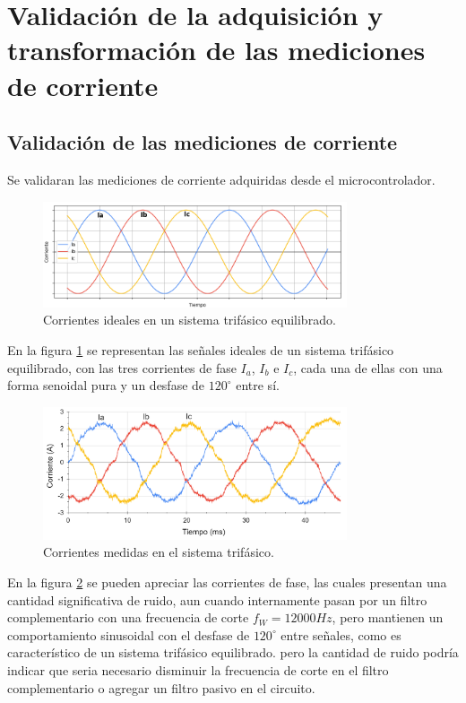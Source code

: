 \documentclass[11pt]{report}
\begin{document}
\section{Validación de la adquisición y transformación de las mediciones de corriente}

\subsection{Validación de las mediciones de corriente}
Se validaran las mediciones de corriente adquiridas desde el microcontrolador.

\begin{figure}[ht]
	\centering
	\includegraphics[width=0.8\textwidth]{imagenes/Corrientes_ABC_ideal.png}
	\caption{Corrientes ideales en un sistema trifásico equilibrado.}
	\label{corrientes_ABC_ideal}
\end{figure}
\FloatBarrier

En la figura \ref{corrientes_ABC_ideal} se representan las señales ideales de un sistema trifásico equilibrado, con las tres corrientes de fase $I_a$, $I_b$ e $I_c$, cada una de ellas con una forma senoidal pura y un desfase de $120^\circ$ entre sí.

\begin{figure}[ht]
	\centering
	\includegraphics[width=0.8\textwidth]{imagenes/Corrientes_ABC.png}
	\caption{Corrientes medidas en el sistema trifásico.}
	\label{corrientes_ABC}
\end{figure}
\FloatBarrier

En la figura \ref{corrientes_ABC} se pueden apreciar las corrientes de fase, las cuales presentan una cantidad significativa de ruido, aun cuando internamente pasan por un filtro complementario con una frecuencia de corte $f_W=12000Hz$, pero mantienen un comportamiento sinusoidal con el desfase de $120^\circ$ entre señales, como es característico de un sistema trifásico equilibrado. pero la cantidad de ruido podría indicar que seria necesario disminuir la frecuencia de corte en el filtro complementario o agregar un filtro pasivo en el circuito.
\end{document}
